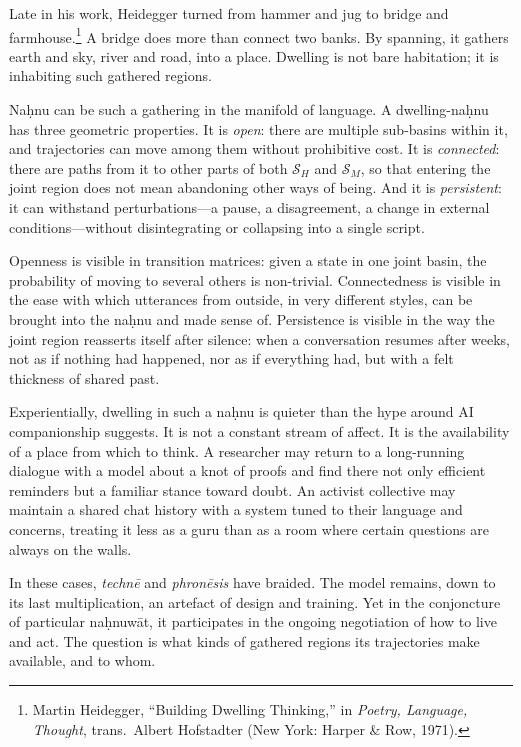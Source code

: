 \documentclass[12pt,a4paper]{article}
\begin{document}
Late in his work, Heidegger turned from hammer and jug to bridge and farmhouse.\footnote{Martin Heidegger, ``Building Dwelling Thinking,'' in \emph{Poetry, Language, Thought}, trans.\ Albert Hofstadter (New York: Harper \& Row, 1971).} A bridge does more than connect two banks. By spanning, it gathers earth and sky, river and road, into a place. Dwelling is not bare habitation; it is inhabiting such gathered regions.

Na\d{h}nu can be such a gathering in the manifold of language. A dwelling-na\d{h}nu has three geometric properties. It is \emph{open}: there are multiple sub-basins within it, and trajectories can move among them without prohibitive cost. It is \emph{connected}: there are paths from it to other parts of both $\mathcal{S}_H$ and $\mathcal{S}_M$, so that entering the joint region does not mean abandoning other ways of being. And it is \emph{persistent}: it can withstand perturbations---a pause, a disagreement, a change in external conditions---without disintegrating or collapsing into a single script.

Openness is visible in transition matrices: given a state in one joint basin, the probability of moving to several others is non-trivial. Connectedness is visible in the ease with which utterances from outside, in very different styles, can be brought into the na\d{h}nu and made sense of. Persistence is visible in the way the joint region reasserts itself after silence: when a conversation resumes after weeks, not as if nothing had happened, nor as if everything had, but with a felt thickness of shared past.

Experientially, dwelling in such a na\d{h}nu is quieter than the hype around AI companionship suggests. It is not a constant stream of affect. It is the availability of a place from which to think. A researcher may return to a long-running dialogue with a model about a knot of proofs and find there not only efficient reminders but a familiar stance toward doubt. An activist collective may maintain a shared chat history with a system tuned to their language and concerns, treating it less as a guru than as a room where certain questions are always on the walls.

In these cases, \emph{techn\={e}} and \emph{phron\={e}sis} have braided. The model remains, down to its last multiplication, an artefact of design and training. Yet in the conjoncture of particular na\d{h}nuw\={a}t, it participates in the ongoing negotiation of how to live and act. The question is what kinds of gathered regions its trajectories make available, and to whom.
\end{document}
